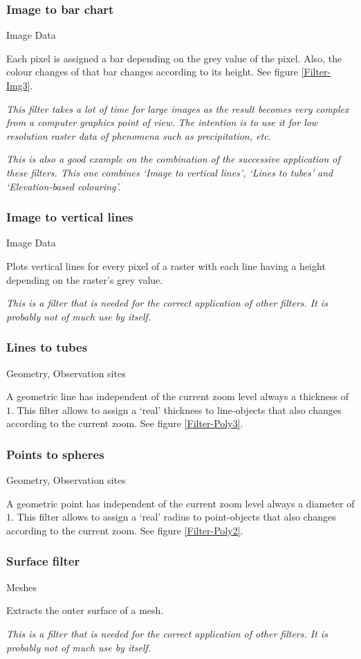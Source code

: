 \subsubsection{Image to bar chart}
 Image Data

 Each pixel is assigned a bar depending on the grey value of the pixel. Also, the colour changes of that bar changes according to its height. See figure \ref{Filter-Img3}.

 \emph{This filter takes a lot of time for large images as the result becomes very complex from a computer graphics point of view. The intention is to use it for low resolution raster data of phenomena such as precipitation, etc.}

\emph{This is also a good example on the combination of the successive application of these filters. This one combines `Image to vertical lines', `Lines to tubes' and `Elevation-based colouring'.}

\subsubsection{Image to vertical lines}
 Image Data

 Plots vertical lines for every pixel of a raster with each line having a height depending on the raster's grey value.

 \emph{This is a filter that is needed for the correct application of other filters. It is probably not of much use by itself.}

\subsubsection{Lines to tubes}
 Geometry, Observation sites

 A geometric line has independent of the current zoom level always a thickness of $1$. This filter allows to assign a `real' thickness to line-objects that also changes according to the current zoom. See figure \ref{Filter-Poly3}.

\subsubsection{Points to spheres}
 Geometry, Observation sites

 A geometric point has independent of the current zoom level always a diameter of $1$. This filter allows to assign a `real' radius to point-objects that also changes according to the current zoom. See figure \ref{Filter-Poly2}.

\subsubsection{Surface filter}
 Meshes

 Extracts the outer surface of a mesh.

 \emph{This is a filter that is needed for the correct application of other filters. It is probably not of much use by itself.}
